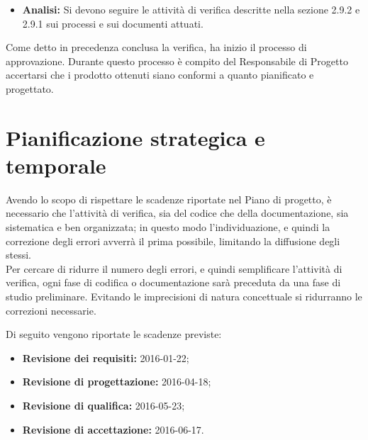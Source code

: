 \documentclass[a4paper]{report}
\begin{document}
			\begin{itemize}
				\item \textbf{Analisi:} Si devono seguire le attività di verifica descritte nella sezione 2.9.2 e 2.9.1 sui processi 
				e sui documenti attuati.
			\end{itemize}
			
			Come detto in precedenza conclusa la verifica, ha inizio il processo di approvazione. Durante questo processo è compito 
			del Responsabile di Progetto accertarsi che i prodotto ottenuti siano conformi a quanto pianificato e progettato.
		
		
		\section{Pianificazione strategica e temporale}
			Avendo lo scopo di rispettare le scadenze riportate nel Piano di progetto, è necessario che l'attività 
			di verifica, sia del codice che della documentazione, sia sistematica e ben organizzata; in questo modo 
			l'individuazione, e quindi la correzione degli errori avverrà il prima possibile, limitando la diffusione 
			degli stessi.\\
			Per cercare di ridurre il numero degli errori, e quindi semplificare l'attività di verifica, ogni fase 
			di codifica o documentazione sarà preceduta da una fase di studio preliminare. Evitando le imprecisioni 
			di natura concettuale si ridurranno le correzioni necessarie.
			
			Di seguito vengono riportate le scadenze previste:
			\begin{itemize}
				\item \textbf{Revisione dei requisiti:} 2016-01-22;
				\item \textbf{Revisione di progettazione:} 2016-04-18;
				\item \textbf{Revisione di qualifica:} 2016-05-23;
				\item \textbf{Revisione di accettazione:} 2016-06-17.
			\end{itemize}
\end{document}
